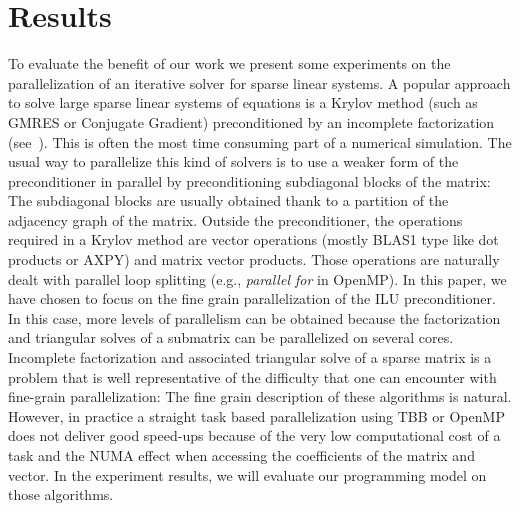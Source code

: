 \section{Results}

To evaluate the benefit of our work we present some experiments on the parallelization of an iterative solver for sparse linear systems.
A popular approach to solve large sparse linear systems of equations is a Krylov method (such as GMRES or Conjugate Gradient) preconditioned by an incomplete factorization (see~\cite{Saad96IMSLS}).
This is often the most time consuming part of a numerical simulation.
The usual way to parallelize this kind of solvers is to use a weaker form of the preconditioner in parallel by preconditioning subdiagonal blocks of the matrix: The subdiagonal blocks are usually obtained thank to a partition of the adjacency graph of the matrix.
Outside the preconditioner, the operations required in a Krylov method are vector operations (mostly BLAS1 type like dot products or AXPY) and matrix vector products.
Those operations are naturally dealt with parallel loop splitting  (e.g., {\em parallel for} in OpenMP).
In this paper, we have chosen to focus on the fine grain parallelization of the ILU preconditioner.
In this case, more levels of parallelism can be obtained because the factorization
and triangular solves of a submatrix can be parallelized on several cores.
Incomplete factorization and associated triangular solve of a sparse matrix
is a problem that is well representative of the difficulty that one can encounter
with fine-grain parallelization: The fine grain description of these algorithms
is natural. However, in practice a straight task based parallelization using TBB or
OpenMP does not deliver good speed-ups because of the very low computational cost of
a task and the NUMA effect when accessing the coefficients of the matrix and vector.
In the experiment results, we will evaluate our programming model on those algorithms.

